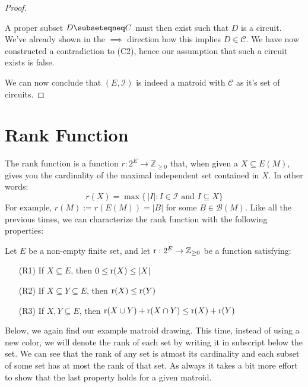 \begin{proof}
\begin{enumerate}
  A proper subset $D  \subseteqneq C$ must then exist such that $D$ is a circuit. We've already shown in the $\implies$ direction how this implies $D \in \mathcal C$. We have now constructed a contradiction to (C2), hence our assumption that such a circuit exists is false.

\end{enumerate}



  We can now conclude that $(E, \mathcal I)$ is indeed a matroid with $\mathcal C$ as it's set of circuits.
\end{proof}



\section{Rank Function}

The rank function is a function $r:2^E \rightarrow \mathbb{Z}_{\geq0}$ that, when given a $X\subseteq E(M)$, gives you the cardinality of the maximal independent set contained in $X$. In other words:
$$ r(X) = \max\{\, |I| : I\in\mathcal{I} \text{ and } I\subseteq X \} $$
For example, $r(M):=r(E(M))=|B|$ for some $B\in\mathcal{B}(M)$. Like all the previous times, we can characterize the rank function with the following properties:

\begin{defn}
    Let $E$ be a non-empty finite set, and let $\operatorname{r} : 2^E \rightarrow \mathbb{Z}_{\geq0}$ be a function satisfying:
    \begin{enumerate}
        \item[(R1)] If $X\subseteq E$, then $0 \leq \operatorname{r}(X) \leq |X| $
        \item[(R2)] If $X\subseteq Y\subseteq E$, then $\operatorname{r}(X)\leq\operatorname{r}(Y)$
        \item[(R3)] If $X,Y\subseteq E$, then $\operatorname{r}(X\cup Y)+\operatorname{r}(X\cap Y) \leq \operatorname{r}(X)+\operatorname{r}(Y) $
    \end{enumerate}
\end{defn}

Below, we again find our example matroid drawing. This time, instead of using a new color, we will denote the rank of each set by writing it in subscript below the set. We can see that the rank of any set is atmost its cardinality and each subset of some set has at most the rank of that set. As always it takes a bit more effort to show that the last property holds for a given matroid.

